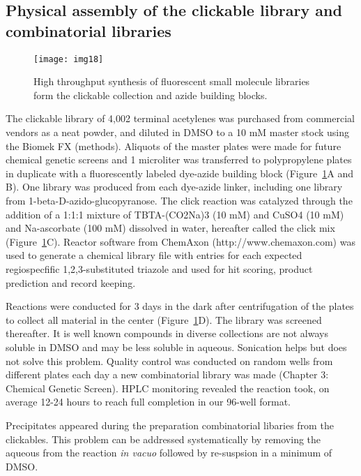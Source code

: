 \subsection {Physical assembly of the clickable library and combinatorial libraries}

\begin{figure}
\texttt{[image: img18]}
\caption{High throughput synthesis of fluorescent small molecule libraries form the clickable collection and azide building blocks.}
\label{fig:SynthFluorLibraries}
\end{figure}

The clickable library of 4,002 terminal acetylenes was purchased from commercial vendors as a neat powder, and diluted in DMSO to a 10 mM master stock using the Biomek FX (methods). Aliquots of the master plates were made for future chemical genetic screens and 1 microliter was transferred to polypropylene plates in duplicate with a fluorescently labeled dye-azide building block (Figure~\ref{fig:SynthFluorLibraries}A and B). One library was produced from each dye-azide linker, including one library from 1-beta-D-azido-glucopyranose. The click reaction was catalyzed through the addition of a 1:1:1 mixture of TBTA-(CO2Na)3 (10 mM) and CuSO4 (10 mM) and Na-ascorbate (100 mM) dissolved in water, hereafter called the click mix (Figure~\ref{fig:SynthFluorLibraries}C). Reactor software from ChemAxon (http://www.chemaxon.com) was used to generate a chemical library file with entries for each expected regiospecfific 1,2,3-substituted triazole and used for hit scoring, product prediction and record keeping.

Reactions were conducted for 3 days in the dark after centrifugation of the plates to collect all material in the center (Figure~\ref{fig:SynthFluorLibraries}D). The library was screened thereafter. It is well known compounds in diverse collections are not always soluble in DMSO \cite{lipinski2000drug} and may be less soluble in aqueous. Sonication helps but does not solve this problem. Quality control was conducted on random wells from different plates each day a new combinatorial library was made (Chapter 3: Chemical Genetic Screen). HPLC monitoring revealed the reaction took, on average 12-24 hours to reach full completion in our 96-well format. 

Precipitates appeared during the preparation combinatorial libaries from the clickables. This problem can be addressed systematically by removing the aqueous from the reaction {\it in vacuo} followed by re-suspsion in a minimum of DMSO.


